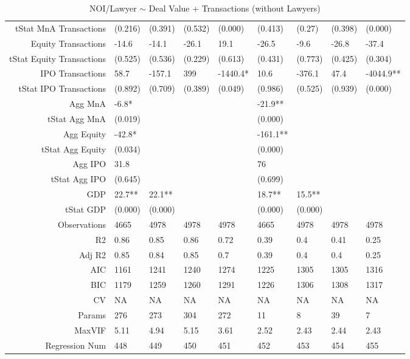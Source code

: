 \begin{table}[ht]
\begin{tabular}{rllllllll}
  tStat MnA Transactions & (0.216) & (0.391) & (0.532) & (0.000) & (0.413) & (0.27) & (0.398) & (0.000) \\ 
  Equity Transactions & -14.6 & -14.1 & -26.1 & 19.1 & -26.5 & -9.6 & -26.8 & -37.4 \\ 
  tStat Equity Transactions & (0.525) & (0.536) & (0.229) & (0.613) & (0.431) & (0.773) & (0.425) & (0.304) \\ 
  IPO Transactions & 58.7 & -157.1 & 399 & -1440.4* & 10.6 & -376.1 & 47.4 & -4044.9** \\ 
  tStat IPO Transactions & (0.892) & (0.709) & (0.389) & (0.049) & (0.986) & (0.525) & (0.939) & (0.000) \\ 
  Agg MnA & -6.8* &  &  &  & -21.9** &  &  &  \\ 
  tStat Agg MnA & (0.019) &  &  &  & (0.000) &  &  &  \\ 
  Agg Equity & -42.8* &  &  &  & -161.1** &  &  &  \\ 
  tStat Agg Equity & (0.034) &  &  &  & (0.000) &  &  &  \\ 
  Agg IPO & 31.8 &  &  &  & 76 &  &  &  \\ 
  tStat Agg IPO & (0.645) &  &  &  & (0.699) &  &  &  \\ 
  GDP & 22.7** & 22.1** &  &  & 18.7** & 15.5** &  &  \\ 
  tStat GDP & (0.000) & (0.000) &  &  & (0.000) & (0.000) &  &  \\ 
  Observations & 4665 & 4978 & 4978 & 4978 & 4665 & 4978 & 4978 & 4978 \\ 
  R2 & 0.86 & 0.85 & 0.86 & 0.72 & 0.39 & 0.4 & 0.41 & 0.25 \\ 
  Adj R2 & 0.85 & 0.84 & 0.85 & 0.7 & 0.39 & 0.4 & 0.4 & 0.25 \\ 
  AIC & 1161 & 1241 & 1240 & 1274 & 1225 & 1305 & 1305 & 1316 \\ 
  BIC & 1179 & 1259 & 1260 & 1291 & 1226 & 1306 & 1308 & 1317 \\ 
  CV & NA & NA & NA & NA & NA & NA & NA & NA \\ 
  Params & 276 & 273 & 304 & 272 & 11 & 8 & 39 & 7 \\ 
  MaxVIF & 5.11 & 4.94 & 5.15 & 3.61 & 2.52 & 2.43 & 2.44 & 2.43 \\ 
  Regression Num & 448 & 449 & 450 & 451 & 452 & 453 & 454 & 455 \\ 
   \hline
\end{tabular}
\caption{NOI/Lawyer $\sim$ Deal Value + Transactions (without Lawyers)} 
\end{table}
